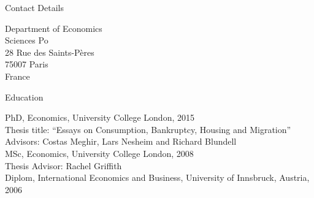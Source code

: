 \documentclass{cvjobmarket} %
\begin{document}





\begin{rSection}{Contact Details}

{Department of Economics} \\ 
{Sciences Po} \\ 
{28 Rue des Saints-Pères} \\ 
{75007 Paris} \\ 
{France} \\ 

\end{rSection}




\begin{rSection}{Education}

{PhD, Economics, University College London, 2015}\\
{Thesis title: ``Essays on Consumption, Bankruptcy, Housing and Migration''}\\
{Advisors: Costas Meghir, Lars Nesheim and Richard Blundell}\\

{MSc, Economics, University College London, 2008}\\
{Thesis Advisor: Rachel Griffith}\\

{Diplom, International Economics and Business, University of
  Innsbruck, Austria, 2006}\\ 

\end{rSection}
\end{document}
